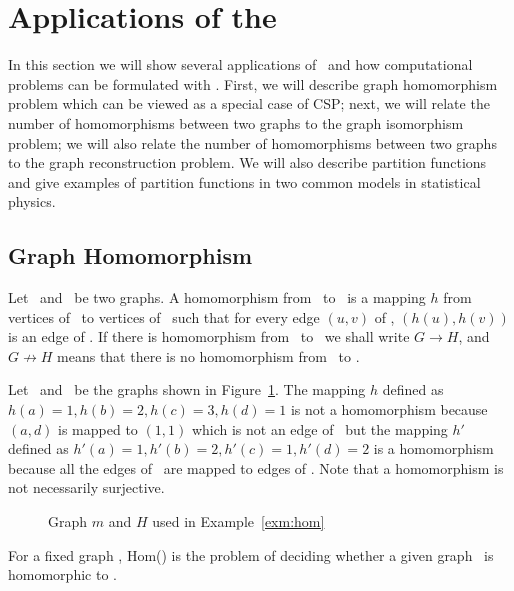 \section{Applications of the \ccsp} \label{sec:appl}
In this section we will show several applications of \ccsp\ and how computational problems
can be formulated with \ccsp\@. First, we will describe graph
homomorphism problem which can be viewed as a special case of CSP; next, we will relate
the number of homomorphisms between two graphs to the graph isomorphism problem;
we will also relate the number of homomorphisms between two graphs to
the graph reconstruction problem. We will also describe partition functions
and give examples of partition functions in two common models in statistical physics.

\subsection*{Graph Homomorphism}
Let \mG\ and \mH\ be two graphs. A homomorphism from \mG\ to \mH\ is a mapping \(h\) from
vertices of \mG\ to vertices of \mH\ such that for every edge \((u,v)\) of \mG,
\((h(u),h(v))\) is an edge of \mH\@. If there is homomorphism from \mG\ to \mH\ 
we shall write \(G\to H\), and \(G \not\to H\) means that there is no homomorphism from
\mG\ to \mH\@.

\begin{example}\label{exm:hom}
Let \mG\ and \mH\ be the graphs shown in Figure~\ref{fig:hom}\@. The mapping \(h\)
defined as \(h(a)=1, h(b)=2, h(c)=3, h(d)=1\)
is not a homomorphism because \((a,d)\) is mapped to \((1,1)\) which is not an 
edge of \mH\ but the mapping \(h'\) defined as \(h'(a)=1, h'(b)=2, h'(c)=1, h'(d)=2\) 
is a homomorphism because all the edges of \mG\ are mapped to edges of \mH. 
Note that a homomorphism is not necessarily surjective.

\begin{figure}[h]
\center
\caption{Graph \ensuremath{m} and \ensuremath{H} used in Example~\ref{exm:hom}} \label{fig:hom}
\end{figure}
\end{example}

\begin{defi}[Hom(\mH)]
For a fixed graph \mH, Hom(\mH) is the problem of deciding whether a given graph \mG\
is homomorphic to \mH\@.
\end{defi}

